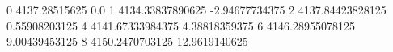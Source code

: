 0 4137.28515625 0.0
1 4134.33837890625 -2.94677734375
2 4137.84423828125 0.55908203125
4 4141.67333984375 4.38818359375
6 4146.28955078125 9.00439453125
8 4150.2470703125 12.9619140625
